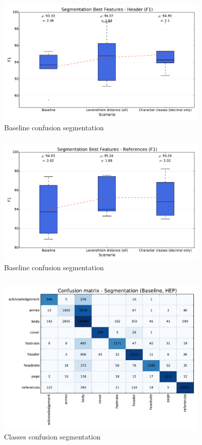 \documentclass{beamer}
\begin{document}

\begin{frame}
\frametitle{}
\begin{figure}[h]
\center
\includegraphics[width=4in]{Figures/header.pdf}
\caption{Baseline confusion segmentation}
\end{figure}
\end{frame}


\begin{frame}
\frametitle{}
\begin{figure}[h]
\center
\includegraphics[width=4in]{Figures/references.pdf}
\caption{Baseline confusion segmentation}
\end{figure}
\end{frame}


\begin{frame}
\frametitle{}
\begin{figure}[h]
\center
\includegraphics[width=4in]{Figures/baseline_confusion_segmentation.pdf}
\caption{Classes confusion segmentation}
\end{figure}
\end{frame}
\end{document}
